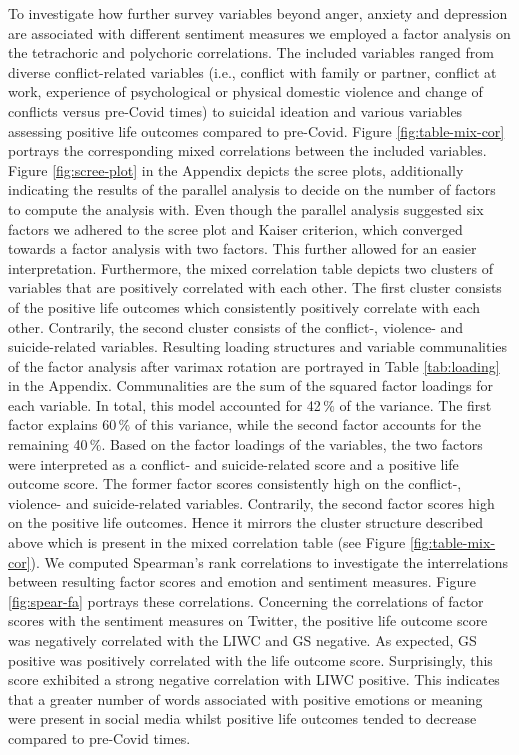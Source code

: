 \documentclass[
  english,
  jou,floatsintext]{apa7}
\begin{document}
To investigate how further survey variables beyond anger, anxiety and depression are associated with different sentiment measures we employed a factor analysis on the tetrachoric and polychoric correlations. The included variables ranged from diverse conflict-related variables (i.e., conflict with family or partner, conflict at work, experience of psychological or physical domestic violence and change of conflicts versus pre-Covid times) to suicidal ideation and various variables assessing positive life outcomes compared to pre-Covid. Figure \ref{fig:table-mix-cor} portrays the corresponding mixed correlations between the included variables.
Figure \ref{fig:scree-plot} in the Appendix depicts the scree plots, additionally indicating the results of the parallel analysis to decide on the number of factors to compute the analysis with. Even though the parallel analysis suggested six factors we adhered to the scree plot and Kaiser criterion, which converged towards a factor analysis with two factors. This further allowed for an easier interpretation. Furthermore, the mixed correlation table depicts two clusters of variables that are positively correlated with each other. The first cluster consists of the positive life outcomes which consistently positively correlate with each other. Contrarily, the second cluster consists of the conflict-, violence- and suicide-related variables.
Resulting loading structures and variable communalities of the factor analysis after varimax rotation are portrayed in Table \ref{tab:loading} in the Appendix.
Communalities are the sum of the squared factor loadings for each variable. In total, this model accounted for 42\(\,\%\) of the variance. The first factor explains 60\(\,\%\) of this variance, while the second factor accounts for the remaining 40\(\,\%\).
Based on the factor loadings of the variables, the two factors were interpreted as a conflict- and suicide-related score and a positive life outcome score.
The former factor scores consistently high on the conflict-, violence- and suicide-related variables. Contrarily, the second factor scores high on the positive life outcomes. Hence it mirrors the cluster structure described above which is present in the mixed correlation table (see Figure \ref{fig:table-mix-cor}). We computed Spearman's rank correlations to investigate the interrelations between resulting factor scores and emotion and sentiment measures. Figure \ref{fig:spear-fa} portrays these correlations.
Concerning the correlations of factor scores with the sentiment measures on Twitter, the positive life outcome score was negatively correlated with the LIWC and GS negative. As expected, GS positive was positively correlated with the life outcome score. Surprisingly, this score exhibited a strong negative correlation with LIWC positive. This indicates that a greater number of words associated with positive emotions or meaning were present in social media whilst positive life outcomes tended to decrease compared to pre-Covid times.
\end{document}

